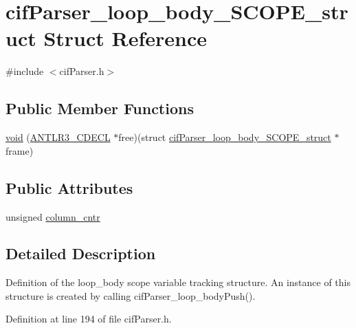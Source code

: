 \hypertarget{structcif_parser__loop__body___s_c_o_p_e__struct}{\section{cif\-Parser\-\_\-loop\-\_\-body\-\_\-\-S\-C\-O\-P\-E\-\_\-struct Struct Reference}
\label{structcif_parser__loop__body___s_c_o_p_e__struct}
}


{\ttfamily \#include $<$cif\-Parser.\-h$>$}

\subsection*{Public Member Functions}
\begin{DoxyCompactItemize}
\item 
\hyperlink{structcif_parser__loop__body___s_c_o_p_e__struct_a1e9d80ce9b390867bda1e17381f34792}{void} (\hyperlink{antlr3defs_8h_a91c919dd260a95cc88a0cd9b5c0a11cc}{A\-N\-T\-L\-R3\-\_\-\-C\-D\-E\-C\-L} $\ast$free)(struct \hyperlink{structcif_parser__loop__body___s_c_o_p_e__struct}{cif\-Parser\-\_\-loop\-\_\-body\-\_\-\-S\-C\-O\-P\-E\-\_\-struct} $\ast$frame)
\end{DoxyCompactItemize}
\subsection*{Public Attributes}
\begin{DoxyCompactItemize}
\item 
unsigned \hyperlink{structcif_parser__loop__body___s_c_o_p_e__struct_a6e785d0c122d2df1fb913393fe453f15}{column\-\_\-cntr}
\end{DoxyCompactItemize}


\subsection{Detailed Description}
Definition of the loop\-\_\-body scope variable tracking structure. An instance of this structure is created by calling cif\-Parser\-\_\-loop\-\_\-body\-Push(). 

Definition at line 194 of file cif\-Parser.\-h.



